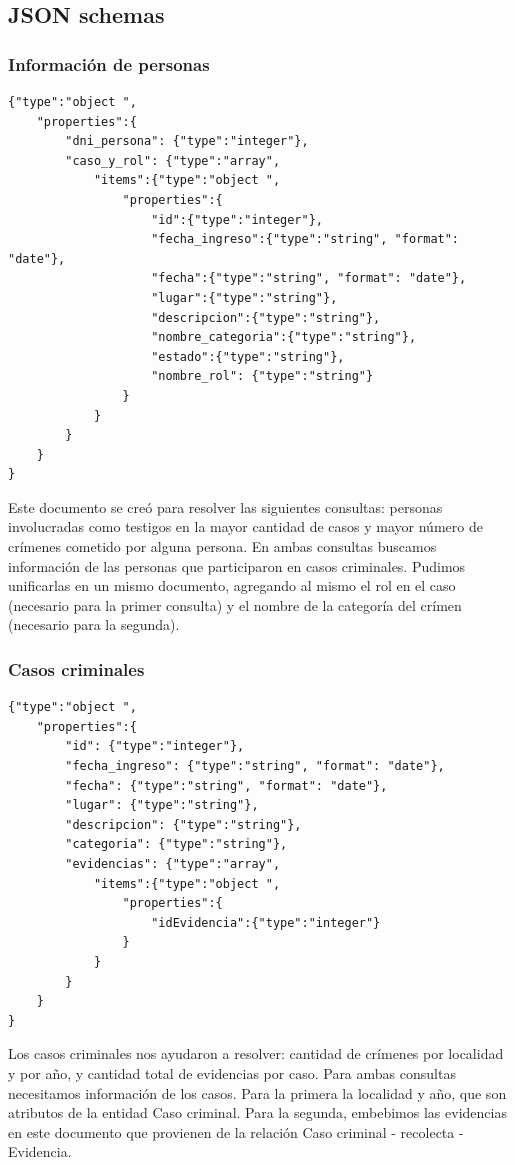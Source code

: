 \documentclass[10pt,a4paper]{article}
\begin{document}
\subsection{JSON schemas}

\subsubsection{Información de personas}
\begin{lstlisting}
{"type":"object ",
	"properties":{
		"dni_persona": {"type":"integer"},
		"caso_y_rol": {"type":"array",
			"items":{"type":"object ",
				"properties":{
					"id":{"type":"integer"},
					"fecha_ingreso":{"type":"string", "format": "date"},
					"fecha":{"type":"string", "format": "date"},
					"lugar":{"type":"string"},
					"descripcion":{"type":"string"},
					"nombre_categoria":{"type":"string"},
					"estado":{"type":"string"},
					"nombre_rol": {"type":"string"}
				}
			}
		}
	}
}
\end{lstlisting}

Este documento se creó para resolver las siguientes consultas: personas involucradas como testigos en la mayor cantidad de casos y mayor número de crímenes cometido por alguna persona.
En ambas consultas buscamos información de las personas que participaron en casos criminales. Pudimos unificarlas en un mismo documento, agregando al mismo el rol en el caso (necesario para la primer consulta) y el nombre de la categoría del crímen (necesario para la segunda).

\subsubsection{Casos criminales}
\begin{lstlisting}
{"type":"object ",
	"properties":{
		"id": {"type":"integer"},
		"fecha_ingreso": {"type":"string", "format": "date"},
		"fecha": {"type":"string", "format": "date"},
		"lugar": {"type":"string"},
		"descripcion": {"type":"string"},
		"categoria": {"type":"string"},
		"evidencias": {"type":"array",
			"items":{"type":"object ",
				"properties":{
					"idEvidencia":{"type":"integer"}
				}
			}
		}
	}
}
\end{lstlisting}

Los casos criminales nos ayudaron a resolver: cantidad de crímenes por localidad y por año, y cantidad total de evidencias por caso.
Para ambas consultas necesitamos información de los casos. Para la primera la localidad y año, que son atributos de la entidad Caso criminal. Para la segunda, embebimos las evidencias en este documento que provienen de la relación Caso criminal - recolecta - Evidencia.
\end{document}
